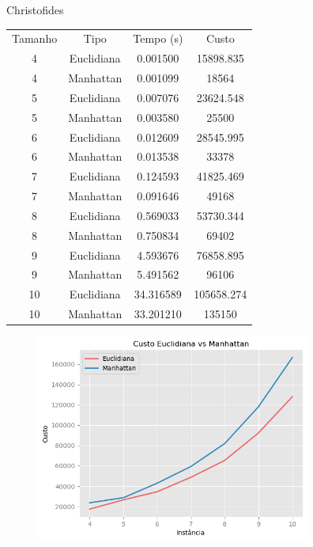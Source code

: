 \documentclass{article}
\begin{document}
\begin{center}
	Christofides \\ [1ex]
	\begin{tabular}{c c c c }
		\hline
		Tamanho & Tipo       & Tempo (s) & Custo      \\ [0.5ex]
		4       & Euclidiana & 0.001500  & 15898.835  \\
		4       & Manhattan  & 0.001099  & 18564      \\
		5       & Euclidiana & 0.007076  & 23624.548  \\
		5       & Manhattan  & 0.003580  & 25500      \\
		6       & Euclidiana & 0.012609  & 28545.995  \\
		6       & Manhattan  & 0.013538  & 33378      \\
		7       & Euclidiana & 0.124593  & 41825.469  \\
		7       & Manhattan  & 0.091646  & 49168      \\
		8       & Euclidiana & 0.569033  & 53730.344  \\
		8       & Manhattan  & 0.750834  & 69402      \\
		9       & Euclidiana & 4.593676  & 76858.895  \\
		9       & Manhattan  & 5.491562  & 96106      \\
		10      & Euclidiana & 34.316589 & 105658.274 \\
		10      & Manhattan  & 33.201210 & 135150     \\ [1ex]
		\hline
	\end{tabular}
\end{center}

\begin{figure} [H]
	\includegraphics[width=9cm]{met_vs}
	\centering
\end{figure}
\end{document}
